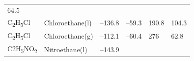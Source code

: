 \documentclass[
  9pt,
]{extbook}
\theoremstyle{definition}
\theoremstyle{definition}
\theoremstyle{definition}
\theoremstyle{remark}
\begin{document}
\begin{longtable}[]{@{}llllll@{}}
\begin{minipage}[t]{0.14\columnwidth}
64.5\strut
\end{minipage}\tabularnewline
\begin{minipage}[t]{0.07\columnwidth}\raggedright
C\textsubscript{2}H\textsubscript{5}Cl\strut
\end{minipage} & \begin{minipage}[t]{0.17\columnwidth}\raggedright
Chloroethane(l)\strut
\end{minipage} & \begin{minipage}[t]{0.15\columnwidth}\raggedright
--136.8\strut
\end{minipage} & \begin{minipage}[t]{0.15\columnwidth}\raggedright
--59.3\strut
\end{minipage} & \begin{minipage}[t]{0.14\columnwidth}\raggedright
190.8\strut
\end{minipage} & \begin{minipage}[t]{0.14\columnwidth}\raggedright
104.3\strut
\end{minipage}\tabularnewline
\begin{minipage}[t]{0.07\columnwidth}\raggedright
C\textsubscript{2}H\textsubscript{5}Cl\strut
\end{minipage} & \begin{minipage}[t]{0.17\columnwidth}\raggedright
Chloroethane(g)\strut
\end{minipage} & \begin{minipage}[t]{0.15\columnwidth}\raggedright
--112.1\strut
\end{minipage} & \begin{minipage}[t]{0.15\columnwidth}\raggedright
--60.4\strut
\end{minipage} & \begin{minipage}[t]{0.14\columnwidth}\raggedright
276\strut
\end{minipage} & \begin{minipage}[t]{0.14\columnwidth}\raggedright
62.8\strut
\end{minipage}\tabularnewline
\begin{minipage}[t]{0.07\columnwidth}\raggedright
C2H\textsubscript{5}NO\textsubscript{2}\strut
\end{minipage} & \begin{minipage}[t]{0.17\columnwidth}\raggedright
Nitroethane(l)\strut
\end{minipage} & \begin{minipage}[t]{0.15\columnwidth}\raggedright
--143.9\strut
\end{minipage} & \begin{minipage}[t]{0.15\columnwidth}\raggedright

\end{minipage}
\end{longtable}
\end{document}
